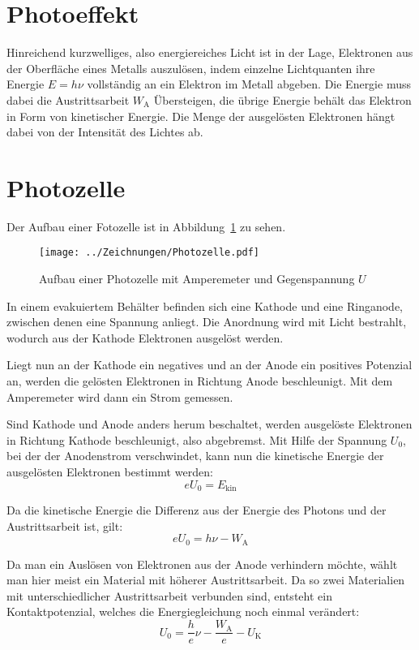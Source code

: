 \section{Photoeffekt}

Hinreichend kurzwelliges, also energiereiches Licht ist in der Lage, Elektronen
aus der Oberfläche eines Metalls auszulösen, indem einzelne Lichtquanten ihre
Energie $E = h\nu$ vollständig an ein Elektron im Metall abgeben. Die Energie
muss dabei die Austrittsarbeit $W_\text{A}$ Übersteigen, die übrige Energie
behält das Elektron in Form von kinetischer Energie. Die Menge der ausgelösten
Elektronen hängt dabei von der Intensität des Lichtes ab.

\section{Photozelle}

Der Aufbau einer Fotozelle ist in Abbildung~\ref{fig:Photozelle} zu sehen.

\begin{figure}
    \centering
    \texttt{[image: ../Zeichnungen/Photozelle.pdf]}
    \caption{%
        Aufbau einer Photozelle mit Amperemeter und Gegenspannung $U$
    }
    \label{fig:Photozelle}
\end{figure}

In einem evakuiertem Behälter befinden sich eine Kathode und eine Ringanode,
zwischen denen eine Spannung anliegt. Die Anordnung wird mit Licht bestrahlt,
wodurch aus der Kathode Elektronen ausgelöst werden.

Liegt nun an der Kathode ein negatives und an der Anode ein positives Potenzial
an, werden die gelösten Elektronen in Richtung Anode beschleunigt. Mit dem
Amperemeter wird dann ein Strom gemessen.

Sind Kathode und Anode anders herum beschaltet, werden ausgelöste Elektronen in
Richtung Kathode beschleunigt, also abgebremst. Mit Hilfe der Spannung $U_0$,
bei der der Anodenstrom verschwindet, kann nun die kinetische Energie der
ausgelösten Elektronen bestimmt werden:
\[eU_0 = E_\text{kin}\]

Da die kinetische Energie die Differenz aus der Energie des Photons und der
Austrittsarbeit ist, gilt:
\[eU_0 = h\nu-W_\text{A}\]

Da man ein Auslösen von Elektronen aus der Anode verhindern möchte, wählt man
hier meist ein Material mit höherer Austrittsarbeit. Da so zwei Materialien mit
unterschiedlicher Austrittsarbeit verbunden sind, entsteht ein
Kontaktpotenzial, welches die Energiegleichung noch einmal verändert:
\begin{equation}
    U_0 = \frac he\nu - \frac{W_\text{A}}e - U_\text{K}
    \label{eq:Energiebilanz}
\end{equation}

